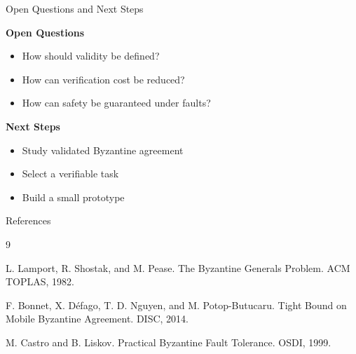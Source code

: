 \documentclass[aspectratio=169,10pt]{beamer}
\begin{document}
\begin{frame}{Open Questions and Next Steps}

\textbf{Open Questions}

\begin{itemize}
\setlength{\itemsep}{0.25cm}
\item How should validity be defined?
\item How can verification cost be reduced?
\item How can safety be guaranteed under faults?
\end{itemize}

\vspace{0.6cm}

\textbf{Next Steps}

\begin{itemize}
\item Study validated Byzantine agreement
\item Select a verifiable task
\item Build a small prototype
\end{itemize}


\end{frame}


\begin{frame}{References}

\footnotesize

\begin{thebibliography}{9}

L. Lamport, R. Shostak, and M. Pease.
\newblock The Byzantine Generals Problem.
\newblock ACM TOPLAS, 1982.

F. Bonnet, X. D\'efago,
T. D. Nguyen, and M. Potop-Butucaru.
\newblock Tight Bound on Mobile Byzantine Agreement.
\newblock DISC, 2014.

M. Castro and B. Liskov.
\newblock Practical Byzantine Fault Tolerance.
\newblock OSDI, 1999.

\end{thebibliography}


\end{frame}
\end{document}

